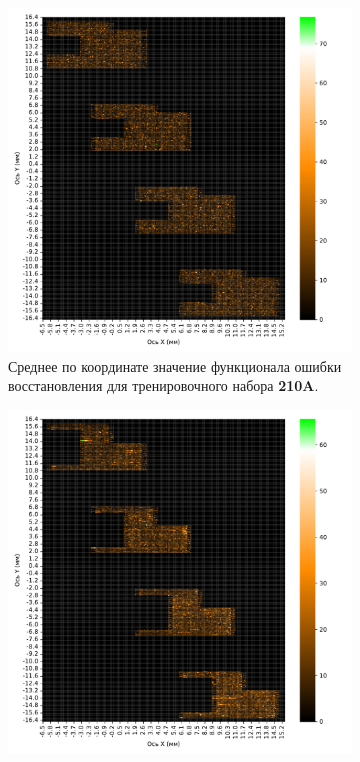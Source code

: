 \documentclass{article}
\begin{document}
    \begin{figure}[H]
        \centering
        \begin{subfigure}{.47\textwidth}
            \centering
            \includegraphics[scale=.35]{lstm_4_window_xy_train_before.pdf}
            \caption{Среднее по координате значение функционала ошибки восстановления для тренировочного набора \textbf{210A}.}\label{lstm_4_window_xy_train_before}
        \end{subfigure}
        \hfill
        \begin{subfigure}{.47\textwidth}
            \centering
            \includegraphics[scale=.35]{lstm_4_window_xy_test_before.pdf}

\end{subfigure}
\end{figure}
\end{document}
